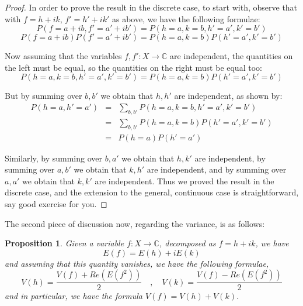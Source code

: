 \documentclass[12pt]{amsbook}
\newtheorem{proposition}[theorem]{Proposition}
\begin{document}
\begin{proof}
In order to prove the result in the discrete case, to start with, observe that with $f=h+ik$, $f'=h'+ik'$ as above, we have the following formulae:
$$P(f=a+ib,f'=a'+ib')=P(h=a,k=b,h'=a',k'=b')$$
$$P(f=a+ib)P(f'=a'+ib')=P(h=a,k=b)P(h'=a',k'=b')$$

Now assuming that the variables $f,f':X\to\mathbb C$ are independent, the quantities on the left must be equal, so the quantities on the right must be equal too:
$$P(h=a,k=b,h'=a',k'=b')=P(h=a,k=b)P(h'=a',k'=b')$$

But by summing over $b,b'$ we obtain that $h,h'$ are independent, as shown by:
\begin{eqnarray*}
P(h=a,h'=a')
&=&\sum_{b,b'}P(h=a,k=b,h'=a',k'=b')\\
&=&\sum_{b,b'}P(h=a,k=b)P(h'=a',k'=b')\\
&=&P(h=a)P(h'=a')
\end{eqnarray*}

Similarly, by summing over $b,a'$ we obtain that $h,k'$ are independent, by summing over $a,b'$ we obtain that $k,h'$ are independent, and by summing over $a,a'$ we obtain that $k,k'$ are independent. Thus we proved the result in the discrete case, and the extension to the general, continuous case is straightforward, say good exercise for you.
\end{proof}

The second piece of discussion now, regarding the variance, is as follows:

\begin{proposition}
Given a variable $f:X\to\mathbb C$, decomposed as $f=h+ik$, we have
$$E(f)=E(h)+iE(k)$$
and assuming that this quantity vanishes, we have the following formulae,
$$V(h)=\frac{V(f)+Re(E(f^2))}{2}\quad,\quad V(k)=\frac{V(f)-Re(E(f^2))}{2}$$
and in particular, we have the formula $V(f)=V(h)+V(k)$.
\end{proposition}
\end{document}
